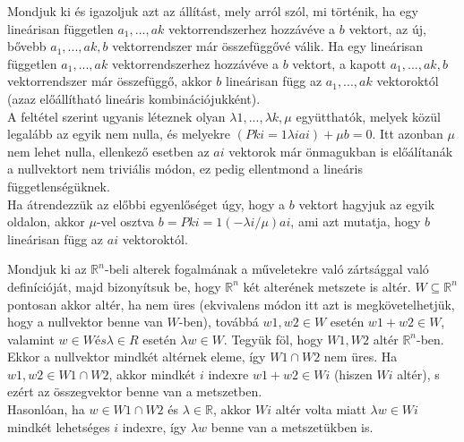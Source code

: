 \begin{frame}
  \begin{tcolorbox}[title={3. (4p)}]
      Mondjuk ki és igazoljuk azt az állítást, mely arról szól, mi történik, ha egy lineárisan független $a_1,...,ak$ vektorrendszerhez hozzávéve a $b$ vektort, az új, bővebb $a_1,...,ak,b$ vektorrendszer már összefüggővé válik.
  \tcblower
    Ha egy lineárisan független $a_1,...,ak$ vektorrendszerhez hozzávéve a $b$ vektort, a kapott $a_1,...,ak,b$ vektorrendszer már összefüggő, akkor $b$ lineárisan függ az $a_1,...,ak$ vektoroktól (azaz előállítható lineáris kombinációjukként).\\
    
    A feltétel szerint ugyanis léteznek olyan ${\lambda}1,...,{\lambda}k,{\mu}$ együtthatók, melyek közül legalább az egyik nem nulla, és melyekre $(Pk i=1 {\lambda}iai) + {\mu}b = 0$. Itt azonban ${\mu}$ nem lehet nulla, ellenkező esetben az $ai$ vektorok már önmagukban is előálítanák a nullvektort nem triviális módon, ez pedig ellentmond a lineáris függetlenségüknek.\\
    
    Ha átrendezzük az előbbi egyenlőséget úgy, hogy a $b$ vektort hagyjuk az egyik oldalon, akkor ${\mu}$-vel osztva $b = Pk i=1(-{\lambda}i/{\mu})ai$, ami azt mutatja, hogy $b$ lineárisan függ az $ai$ vektoroktól.
  \end{tcolorbox}
\end{frame}

\begin{frame}
  \begin{tcolorbox}[title={4. (4p)}]
      Mondjuk ki az $\mathbb{R}^n$-beli alterek fogalmának a műveletekre való zártsággal való definícióját, majd bizonyítsuk be, hogy $\mathbb{R}^n$ két alterének metszete is altér.
  \tcblower
    $W {\subseteq} \mathbb{R}^n$ pontosan akkor altér, ha nem üres (ekvivalens módon itt azt is megkövetelhetjük, hogy a nullvektor benne van $W$-ben), továbbá $w1,w2 \in W$ esetén $w1 +w2 \in W$, valamint $w \in W és {\lambda} \in R$ esetén ${\lambda}w \in W$. Tegyük föl, hogy $W1,W2$ altér $\mathbb{R}^n$-ben.\\
    
    Ekkor a nullvektor mindkét altérnek eleme, így $W1 {\cap}W2$ nem üres. Ha $w1,w2 \in W1 {\cap}W2$, akkor mindkét $i$ indexre $w1 +w2 \in Wi$ (hiszen $Wi$ altér), s ezért az összegvektor benne van a metszetben.\\
    
    Hasonlóan, ha $w \in W1 {\cap} W2$ és ${\lambda} \in \mathbb{R}$, akkor $Wi$ altér volta miatt ${\lambda}w \in Wi$ mindkét lehetséges $i$ indexre, így ${\lambda}w$ benne van a metszetükben is.
  \end{tcolorbox}
\end{frame}


